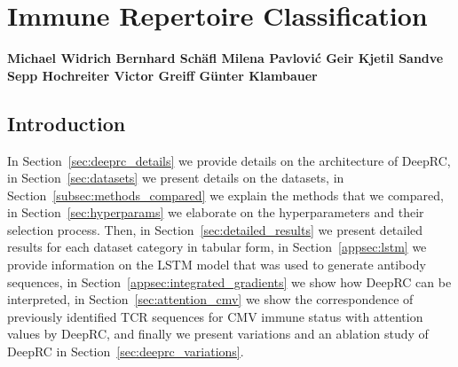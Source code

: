 \documentclass[oneside]{book}
\makeatletter
\newcommand{\chapterauthor}[1]{%
  {\parindent0pt\vspace*{-25pt}%
  \linespread{1.1} \large\bf#1%
  \par\nobreak\vspace*{35pt}}
  \@afterheading%
}
\makeatother
\begin{document}
%



%

%


%

%



%


%

%

%

%

%


%


%

%

%
\renewcommand{\thesection}{A\arabic{section}}
\renewcommand{\thefigure}{A\arabic{figure}}
\renewcommand{\thetable}{A\arabic{table}}
\renewcommand{\theequation}{A\arabic{equation}}

\setcounter{theorem}{0}
\setcounter{section}{0}
\setcounter{table}{0}
\setcounter{figure}{0}
\setcounter{equation}{0}

\newpage
\chapter{Immune Repertoire Classification}
\chapterauthor{Michael Widrich \quad
    Bernhard Sch\"{a}fl \quad 
    Milena Pavlovi{\'c} \quad
    Geir Kjetil Sandve \quad 
    Sepp Hochreiter \quad 
    Victor Greiff \quad
    G\"{u}nter Klambauer}
    
\section{Introduction}
In Section~\ref{sec:deeprc_details} we provide details 
on the architecture of DeepRC, in Section~\ref{sec:datasets} 
we present details on the datasets, in Section~\ref{subsec:methods_compared} we explain the 
methods that we compared, in Section~\ref{sec:hyperparams} we
elaborate on the hyperparameters and their selection process. 
Then, in Section~\ref{sec:detailed_results} we present 
detailed results for each dataset category in tabular form, 
in Section~\ref{appsec:lstm} we provide information on 
the LSTM model that was used to generate antibody sequences,
in Section~\ref{appsec:integrated_gradients} we show 
how DeepRC can be interpreted, in Section~\ref{sec:attention_cmv}
we show the correspondence of previously identified 
TCR sequences for CMV immune status with attention values 
by DeepRC, and finally we present variations and an ablation 
study of DeepRC in Section~\ref{sec:deeprc_variations}. 
\end{document}

